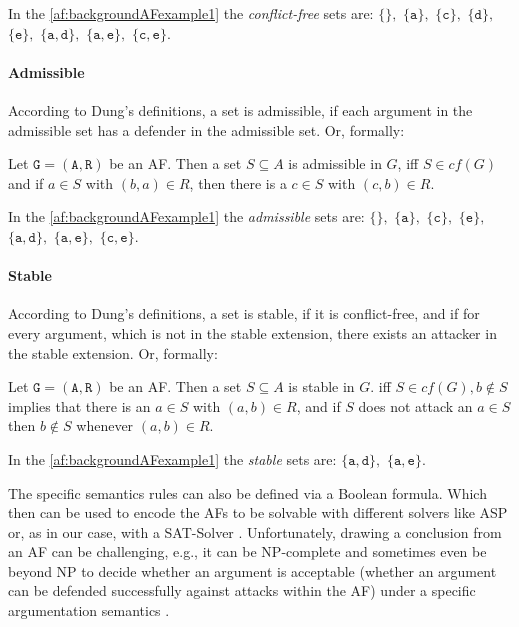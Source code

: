 In the \cref{af:backgroundAFexample1} the \emph{conflict-free} sets are:
$\mathtt{\{\}},$
$\mathtt{\{a\}},$
$\mathtt{\{c\}},$
$\mathtt{\{d\}},$
$\mathtt{\{e\}},$
$\mathtt{\{a, d\}},$
$\mathtt{\{a, e\}},$
$\mathtt{\{c, e\}}$.

\paragraph{Admissible}  According to Dung's definitions, a set is admissible, if each argument in the admissible set has a defender in the admissible set. Or, formally:

\begin{definition}
    Let $\mathtt{G=(A,R)}$ be an AF. Then a set $S \subseteq A$ is admissible in $G$, iff $S \in cf(G)$ and if $a \in S$ with $(b, a) \in R$, then there is a $c \in S$ with $(c, b) \in R$.
\end{definition}


In the \cref{af:backgroundAFexample1} the \emph{admissible} sets are:
$\mathtt{\{\}},$
$\mathtt{\{a\}},$
$\mathtt{\{c\}},$
$\mathtt{\{e\}},$
$\mathtt{\{a, d\}},$
$\mathtt{\{a, e\}},$
$\mathtt{\{c, e\}}$.


\paragraph{Stable}  According to Dung's definitions, a set is stable, if it is conflict-free, and if for every argument, which is not in the stable extension, there exists an attacker in the stable extension. Or, formally:

\begin{definition}
    Let $\mathtt{G=(A,R)}$ be an AF. Then a set  $S \subseteq A$ is stable in $G$. iff $S \in cf(G), b \not\in S$ implies that there is an $a \in S$ with $(a, b) \in R$, and if $S$ does not attack an $a \in S$ then $b \not\in S$ whenever $(a, b) \in R$.
\end{definition}


In the \cref{af:backgroundAFexample1} the \emph{stable} sets are:
$\mathtt{\{a, d\}},$
$\mathtt{\{a, e\}}$.

\vspace{0.5cm}
\noindent
The specific semantics rules can also be defined via a Boolean formula. Which then can be used to encode the AFs to be solvable with different solvers like \ac{ASP} \cite{DBLP:journals/corr/abs-1301-1388} or, as in our case, with a \ac{SAT-Solver} \cite{DBLP:journals/amai/AmgoudD13}. Unfortunately, drawing a conclusion from an AF can be challenging, e.g., it can be NP-complete and sometimes even be beyond NP to decide whether an argument is acceptable (whether an argument can be defended successfully against attacks within the AF) under a specific argumentation semantics \cite{DBLP:journals/ai/DvorakGRW23}.



